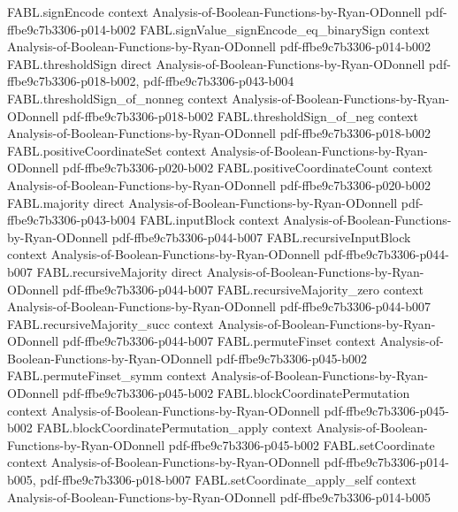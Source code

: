 \begin{theorem}
\proofstep
  {FABL.signEncode}
  {context}
  {Analysis-of-Boolean-Functions-by-Ryan-ODonnell}
  {pdf-ffbe9c7b3306-p014-b002}
\proofstep
  {FABL.signValue_signEncode_eq_binarySign}
  {context}
  {Analysis-of-Boolean-Functions-by-Ryan-ODonnell}
  {pdf-ffbe9c7b3306-p014-b002}
\proofstep
  {FABL.thresholdSign}
  {direct}
  {Analysis-of-Boolean-Functions-by-Ryan-ODonnell}
  {pdf-ffbe9c7b3306-p018-b002,
    pdf-ffbe9c7b3306-p043-b004}
\proofstep
  {FABL.thresholdSign_of_nonneg}
  {context}
  {Analysis-of-Boolean-Functions-by-Ryan-ODonnell}
  {pdf-ffbe9c7b3306-p018-b002}
\proofstep
  {FABL.thresholdSign_of_neg}
  {context}
  {Analysis-of-Boolean-Functions-by-Ryan-ODonnell}
  {pdf-ffbe9c7b3306-p018-b002}
\proofstep
  {FABL.positiveCoordinateSet}
  {context}
  {Analysis-of-Boolean-Functions-by-Ryan-ODonnell}
  {pdf-ffbe9c7b3306-p020-b002}
\proofstep
  {FABL.positiveCoordinateCount}
  {context}
  {Analysis-of-Boolean-Functions-by-Ryan-ODonnell}
  {pdf-ffbe9c7b3306-p020-b002}
\proofstep
  {FABL.majority}
  {direct}
  {Analysis-of-Boolean-Functions-by-Ryan-ODonnell}
  {pdf-ffbe9c7b3306-p043-b004}
\proofstep
  {FABL.inputBlock}
  {context}
  {Analysis-of-Boolean-Functions-by-Ryan-ODonnell}
  {pdf-ffbe9c7b3306-p044-b007}
\proofstep
  {FABL.recursiveInputBlock}
  {context}
  {Analysis-of-Boolean-Functions-by-Ryan-ODonnell}
  {pdf-ffbe9c7b3306-p044-b007}
\proofstep
  {FABL.recursiveMajority}
  {direct}
  {Analysis-of-Boolean-Functions-by-Ryan-ODonnell}
  {pdf-ffbe9c7b3306-p044-b007}
\proofstep
  {FABL.recursiveMajority_zero}
  {context}
  {Analysis-of-Boolean-Functions-by-Ryan-ODonnell}
  {pdf-ffbe9c7b3306-p044-b007}
\proofstep
  {FABL.recursiveMajority_succ}
  {context}
  {Analysis-of-Boolean-Functions-by-Ryan-ODonnell}
  {pdf-ffbe9c7b3306-p044-b007}
\proofstep
  {FABL.permuteFinset}
  {context}
  {Analysis-of-Boolean-Functions-by-Ryan-ODonnell}
  {pdf-ffbe9c7b3306-p045-b002}
\proofstep
  {FABL.permuteFinset_symm}
  {context}
  {Analysis-of-Boolean-Functions-by-Ryan-ODonnell}
  {pdf-ffbe9c7b3306-p045-b002}
\proofstep
  {FABL.blockCoordinatePermutation}
  {context}
  {Analysis-of-Boolean-Functions-by-Ryan-ODonnell}
  {pdf-ffbe9c7b3306-p045-b002}
\proofstep
  {FABL.blockCoordinatePermutation_apply}
  {context}
  {Analysis-of-Boolean-Functions-by-Ryan-ODonnell}
  {pdf-ffbe9c7b3306-p045-b002}
\proofstep
  {FABL.setCoordinate}
  {context}
  {Analysis-of-Boolean-Functions-by-Ryan-ODonnell}
  {pdf-ffbe9c7b3306-p014-b005,
    pdf-ffbe9c7b3306-p018-b007}
\proofstep
  {FABL.setCoordinate_apply_self}
  {context}
  {Analysis-of-Boolean-Functions-by-Ryan-ODonnell}
  {pdf-ffbe9c7b3306-p014-b005}

\end{theorem}
